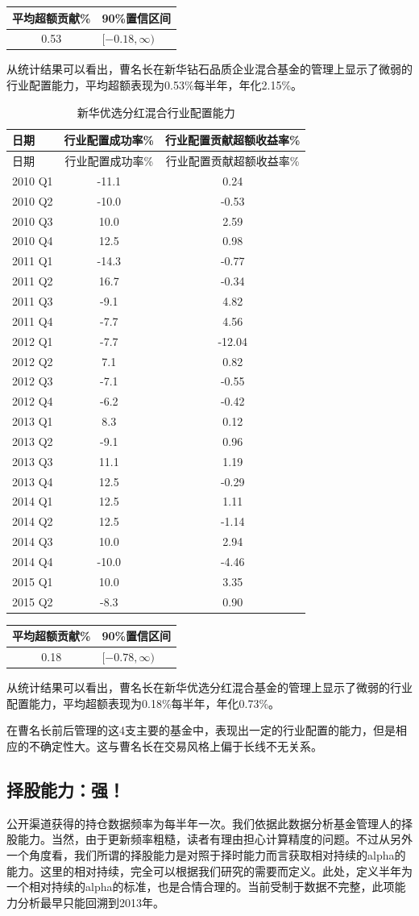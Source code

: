 \documentclass[hyperref,]{ctexart}
\begin{document}
\begin{longtable}[]{@{}cl@{}}
\toprule
平均超额贡献\% & 90\%置信区间\tabularnewline
\midrule
\endhead
0.53 & \([-0.18,\infty)\)\tabularnewline
\bottomrule
\end{longtable}

从统计结果可以看出，曹名长在新华钻石品质企业混合基金的管理上显示了微弱的行业配置能力，平均超额表现为0.53\%每半年，年化2.15\%。

\begin{longtable}[]{@{}lcc@{}}
\caption{新华优选分红混合行业配置能力}\tabularnewline
\toprule
日期 & 行业配置成功率\% & 行业配置贡献超额收益率\%\tabularnewline
\midrule
\endfirsthead
\toprule
日期 & 行业配置成功率\% & 行业配置贡献超额收益率\%\tabularnewline
\midrule
\endhead
2010 Q1 & -11.1 & 0.24\tabularnewline
2010 Q2 & -10.0 & -0.53\tabularnewline
2010 Q3 & 10.0 & 2.59\tabularnewline
2010 Q4 & 12.5 & 0.98\tabularnewline
2011 Q1 & -14.3 & -0.77\tabularnewline
2011 Q2 & 16.7 & -0.34\tabularnewline
2011 Q3 & -9.1 & 4.82\tabularnewline
2011 Q4 & -7.7 & 4.56\tabularnewline
2012 Q1 & -7.7 & -12.04\tabularnewline
2012 Q2 & 7.1 & 0.82\tabularnewline
2012 Q3 & -7.1 & -0.55\tabularnewline
2012 Q4 & -6.2 & -0.42\tabularnewline
2013 Q1 & 8.3 & 0.12\tabularnewline
2013 Q2 & -9.1 & 0.96\tabularnewline
2013 Q3 & 11.1 & 1.19\tabularnewline
2013 Q4 & 12.5 & -0.29\tabularnewline
2014 Q1 & 12.5 & 1.11\tabularnewline
2014 Q2 & 12.5 & -1.14\tabularnewline
2014 Q3 & 10.0 & 2.94\tabularnewline
2014 Q4 & -10.0 & -4.46\tabularnewline
2015 Q1 & 10.0 & 3.35\tabularnewline
2015 Q2 & -8.3 & 0.90\tabularnewline
\bottomrule
\end{longtable}

\begin{longtable}[]{@{}cl@{}}
\toprule
平均超额贡献\% & 90\%置信区间\tabularnewline
\midrule
\endhead
0.18 & \([-0.78,\infty)\)\tabularnewline
\bottomrule
\end{longtable}

从统计结果可以看出，曹名长在新华优选分红混合基金的管理上显示了微弱的行业配置能力，平均超额表现为0.18\%每半年，年化0.73\%。

在曹名长前后管理的这4支主要的基金中，表现出一定的行业配置的能力，但是相应的不确定性大。这与曹名长在交易风格上偏于长线不无关系。

\subsection{择股能力：强！}

公开渠道获得的持仓数据频率为每半年一次。我们依据此数据分析基金管理人的择股能力。当然，由于更新频率粗糙，读者有理由担心计算精度的问题。不过从另外一个角度看，我们所谓的择股能力是对照于择时能力而言获取相对持续的alpha的能力。这里的相对持续，完全可以根据我们研究的需要而定义。此处，定义半年为一个相对持续的alpha的标准，也是合情合理的。当前受制于数据不完整，此项能力分析最早只能回溯到2013年。
\end{document}
